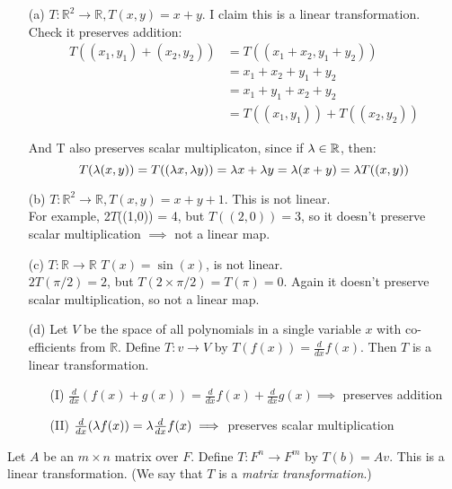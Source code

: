 \begin{examples}
\begin{itemize}
\item[(a)] $T: \mathbb{R}^2 \to \mathbb{R}, T(x,y) = x+y$. I claim this is a linear transformation.\\
Check it preserves addition: \[
\begin{aligned}
T( (x_1, y_1) + (x_2,y_2) ) &= T ((x_1 + x_2, y_1  + y_2))\\
&= x_1 + x_2 + y_1 + y_2 \\
&= x_1 + y_1 + x_2 + y_2 \\
&= T((x_1,y_1)) + T((x_2,y_2))
\end{aligned}\]

And T also preserves scalar multiplicaton, since if $\lambda \in \mathbb{R}$, then:
\[
T(\lambda(x,y)) = T((\lambda x,\lambda y)) = \lambda x + \lambda y = \lambda(x+y) = \lambda T((x,y))\]


\item[(b)] $T: \mathbb{R}^2 \to \mathbb{R}, T(x,y) = x+y + 1$. This is not linear. \\
For example, 2$T$((1,0)) = 4, but $T((2,0)) = 3$, so it doesn't preserve scalar multiplication $\implies$ not a linear map.

\item[(c)] $T: \mathbb{R} \to \mathbb{R}$ $T(x) = \sin(x)$, is not linear.\\
$2T(\pi/2) = 2$, but $T(2\times \pi/2) = T(\pi) = 0$. Again it doesn't preserve scalar multiplication, so not a linear map.

\item[(d)] Let $V$ be the space of all polynomials in a single variable $x$ with co-efficients from $\mathbb{R}$. Define $T:v \to V$ by $T(f(x)) = \frac{d}{dx}f(x)$. Then $T$ is a linear transformation.
\begin{itemize}
\item[(I)] $\frac{d}{dx}(f(x) + g(x)) = \frac{d}{dx}f(x) + \frac{d}{dx}g(x) \implies$ preserves addition
\item[(II)] $\frac{d}{dx}(\lambda f(x)) = \lambda\frac{d}{dx}f(x) \implies $ preserves scalar multiplication
\end{itemize}

\end{itemize}
\end{examples}\vspace*{10pt}

\begin{proposition} Let $A$ be an $m\times n$ matrix over $F$. Define $T: F^n \to F^m$ by $T(b) = Av$. This is a linear transformation. (We say that $T$ is a \emph{matrix transformation}.)	
\end{proposition}


